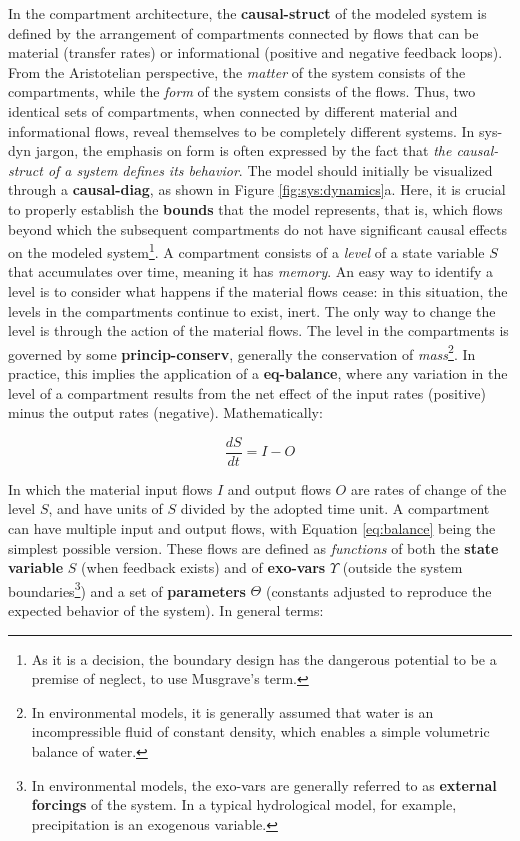 \documentclass[./main_en.tex]{subfiles}
\begin{document}
\par In the compartment architecture, the \textbf{\gls{causal-struct}} of the modeled \gls{system} is defined by the arrangement of compartments connected by flows that can be material (transfer rates) or informational (positive and negative \gls{feedback} loops). From the Aristotelian perspective, the \textit{matter} of the \gls{system} consists of the compartments, while the \textit{form} of the \gls{system} consists of the flows. Thus, two identical sets of compartments, when connected by different material and informational flows, reveal themselves to be completely different systems. In \gls{sys-dyn} jargon, the emphasis on form is often expressed by the fact that \textit{the \gls{causal-struct} of a \gls{system} defines its behavior}. The \gls{model} should initially be visualized through a \textbf{\gls{causal-diag}}, as shown in Figure \ref{fig:sys:dynamics}a. Here, it is crucial to properly establish the \textbf{\gls{bounds}} that the \gls{model} represents, that is, which flows beyond which the subsequent compartments do not have significant causal effects on the modeled \gls{system}\footnote{As it is a decision, the boundary design has the dangerous potential to be a premise of neglect, to use Musgrave's term.}. A compartment consists of a \textit{level} of a state variable $S$ that accumulates over time, meaning it has \textit{memory}. An easy way to identify a level is to consider what happens if the material flows cease: in this situation, the levels in the compartments continue to exist, inert. The only way to change the level is through the action of the material flows. The level in the compartments is governed by some \textbf{\gls{princip-conserv}}, generally the conservation of \textit{mass}\footnote{In environmental models, it is generally assumed that water is an incompressible fluid of constant density, which enables a simple volumetric balance of water.}. In practice, this implies the application of a \textbf{\gls{eq-balance}}, where any variation in the level of a compartment results from the net effect of the input rates (positive) minus the output rates (negative). Mathematically:
\begin{linenomath*}
\begin{equation}
\label{eq:balance}
\frac{dS}{dt} = I - O 
\end{equation}
\end{linenomath*}
\par In which the material input flows $I$ and output flows $O$ are rates of change of the level $S$, and have units of $S$ divided by the adopted time unit. A compartment can have multiple input and output flows, with Equation \eqref{eq:balance} being the simplest possible version. These flows are defined as \textit{functions} of both the \textbf{state variable} $S$ (when feedback exists) and of \textbf{\gls{exo-vars}} $\Upsilon$ (outside the system boundaries\footnote{In environmental models, the \gls{exo-vars} are generally referred to as \textbf{external forcings} of the \gls{system}. In a typical hydrological \gls{model}, for example, precipitation is an exogenous variable.}) and a set of \textbf{\gls{parameters}} $\Theta$ (constants adjusted to reproduce the expected behavior of the system). In general terms:
\end{document}
